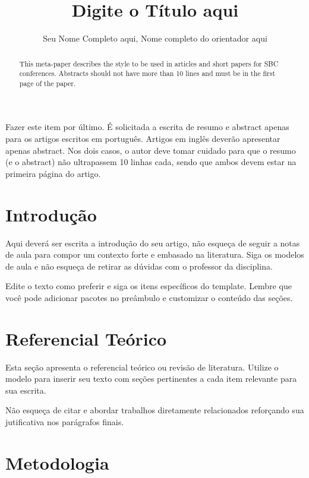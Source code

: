 \documentclass[12pt]{article}
\title{Digite o Título aqui}
\author{Seu Nome Completo aqui, Nome completo do orientador aqui}
\begin{document}
 

\maketitle

\begin{abstract}
  This meta-paper describes the style to be used in articles and short papers
  for SBC conferences. Abstracts should not have more than
  10 lines and must be in the first page of the paper.
\end{abstract}
     
\begin{resumo} 
  Fazer este item por último. É solicitada a escrita de resumo e abstract apenas para os artigos escritos em português. Artigos em inglês deverão apresentar apenas abstract.
  Nos dois casos, o autor deve tomar cuidado para que o resumo (e o abstract)
  não ultrapassem 10 linhas cada, sendo que ambos devem estar na primeira
  página do artigo.
\end{resumo}


\section{Introdução}

Aqui deverá ser escrita a introdução do seu artigo, não esqueça de seguir a notas de aula para compor um contexto forte e embasado na literatura. Siga os modelos de aula e não esqueça de retirar as dúvidas com o professor da disciplina.

Edite o texto como preferir e siga os itens específicos do template. Lembre que você pode adicionar pacotes no preâmbulo e customizar o conteúdo das seções.

\section{Referencial Teórico} \label{sec:ref-teorico}

Esta seção apresenta o referencial teórico ou revisão de literatura. Utilize o modelo para inserir seu texto com seções pertinentes a cada item relevante para sua escrita.

Não esqueça de citar e abordar trabalhos diretamente relacionados reforçando sua jutificativa nos parágrafos finais.

\section{Metodologia}
\end{document}
